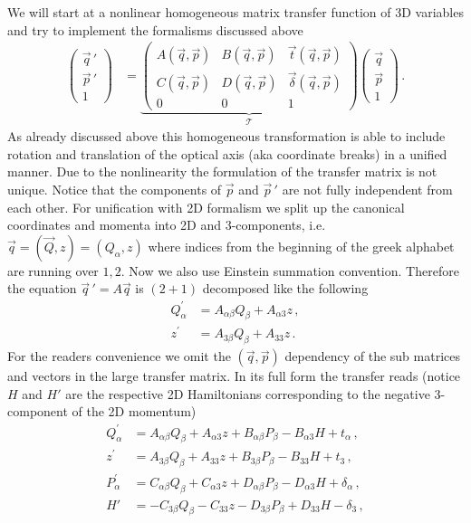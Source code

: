 \documentclass[12pt,a4paper,twoside,openright,BCOR10mm,headsepline,titlepage,abstracton,chapterprefix,final]{scrreprt}
\begin{document}
We will start at a nonlinear homogeneous matrix transfer function of 3D variables and try to implement the formalisms discussed above
\begin{align}
 \begin{pmatrix}
  \vec{q}\,{}'\\
  \vec{p}\,{}'\\
  1
 \end{pmatrix}
 &=
 \underbrace{\begin{pmatrix}
  A(\vec{q},\vec{p}) & B(\vec{q},\vec{p}) & \vec{t}(\vec{q},\vec{p})\\
  C(\vec{q},\vec{p}) & D(\vec{q},\vec{p}) & \vec{\delta}(\vec{q},\vec{p})\\
  0 & 0 & 1 
 \end{pmatrix}}_\mathcal{T}
 \begin{pmatrix}
  \vec{q}\\
  \vec{p}\\
  1
 \end{pmatrix}\,.
\end{align}
As already discussed above this homogeneous transformation is able to include rotation and translation of the optical axis (aka coordinate breaks) 
in a unified manner. Due to the nonlinearity the formulation of the transfer matrix is not unique. Notice that the components of $\vec{p}$ and $\vec{p}\,{}'$
are not fully independent from each other. For unification with 2D formalism we split up the canonical coordinates and momenta into 2D and 3-components, i.e.
$\vec{q} = (\vec{Q}, z) = (Q_\alpha, z)$ where indices from the beginning of the greek alphabet are running over $1,2$. Now we also use Einstein summation
convention. Therefore the equation $\vec{q}\,{}' = A \vec{q}$ is $(2+1)$ decomposed like the following
\begin{align}
 Q^\prime_\alpha &= A_{\alpha\beta} Q_\beta + A_{\alpha 3} z\,,\\
 z^\prime &= A_{3 \beta} Q_\beta + A_{33} z\,.
\end{align}
For the readers convenience we omit the $(\vec{q},\vec{p})$ dependency of the sub matrices and vectors in the large transfer matrix.
In its full form the transfer reads (notice $H$ and $H'$ are the respective 2D Hamiltonians corresponding to the negative 3-component of the 2D momentum)
\begin{subequations}
\label{eq:transfermatrixeqns}
\begin{align}
 Q^\prime_\alpha &= A_{\alpha\beta} Q_\beta + A_{\alpha 3} z + B_{\alpha\beta} P_\beta - B_{\alpha 3} H + t_\alpha\,,\\
 z^\prime &= A_{3 \beta} Q_\beta + A_{33} z + B_{3\beta} P_\beta - B_{33} H + t_3\,,\\
 P^\prime_\alpha &= C_{\alpha\beta} Q_\beta + C_{\alpha 3} z + D_{\alpha\beta} P_\beta - D_{\alpha 3} H + \delta_\alpha\,,\\
 H' &= -C_{3\beta} Q_\beta - C_{33} z - D_{3\beta} P_\beta + D_{33} H - \delta_3\,,
\end{align}
\end{subequations}
\end{document}
